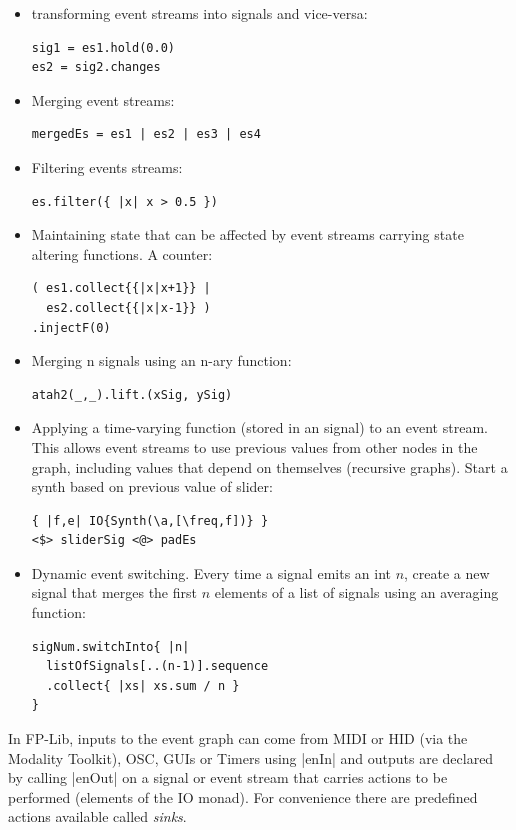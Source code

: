 \documentclass{article}
\begin{document}
\begin{itemize}

\item transforming event streams into signals and vice-versa:
\begin{Verbatim}
sig1 = es1.hold(0.0)
es2 = sig2.changes
\end{Verbatim}
\item Merging event streams:
\begin{Verbatim}
mergedEs = es1 | es2 | es3 | es4
\end{Verbatim}
\item Filtering events streams:
\begin{Verbatim}
es.filter({ |x| x > 0.5 })
\end{Verbatim}
\item Maintaining state that can be affected by event streams carrying state altering functions. A counter:
\begin{Verbatim}
( es1.collect{{|x|x+1}} | 
  es2.collect{{|x|x-1}} )
.injectF(0) 
\end{Verbatim}
\item Merging n signals using an n-ary function:
\begin{Verbatim}
atah2(_,_).lift.(xSig, ySig)
\end{Verbatim}
\item Applying a time-varying function (stored in an signal) to an event stream. This allows event streams to use previous values from other nodes in the graph, including values that depend on themselves (recursive graphs). Start a synth based on previous value of slider:
\begin{Verbatim}
{ |f,e| IO{Synth(\a,[\freq,f])} }
<$> sliderSig <@> padEs 
\end{Verbatim}
\item Dynamic event switching. Every time a signal emits an int $n$, create a new signal that merges the first $n$ elements of a list of signals using an averaging function: 
\begin{Verbatim}
sigNum.switchInto{ |n|
  listOfSignals[..(n-1)].sequence
  .collect{ |xs| xs.sum / n }
}
\end{Verbatim}
\end{itemize}

In FP-Lib, inputs to the event graph can come from MIDI or HID (via the Modality Toolkit), OSC, GUIs or Timers using |enIn| and outputs are declared by calling |enOut| on a signal or event stream that carries actions to be performed (elements of the IO monad). For convenience there are predefined actions available called \textit{sinks}.
\end{document}
